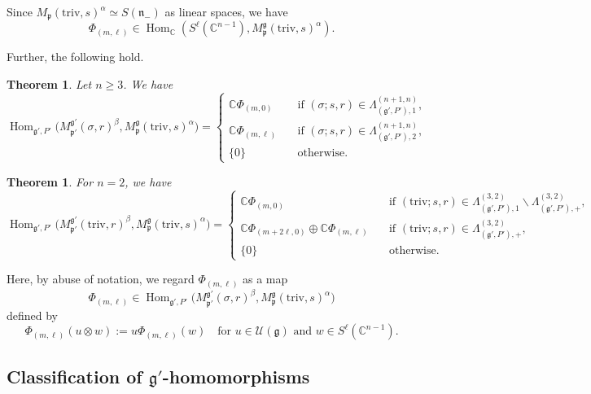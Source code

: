 \documentclass[reqno,11pt]{amsart}
\newtheorem{thm}[equation]{Theorem}
\theoremstyle{remark}
\theoremstyle{definition}
\numberwithin{equation}{section}
\newcommand{\gb}{\beta}
\newcommand{\ga}{\alpha}
\newcommand{\gL}{\Lambda}
\newcommand{\fg}{{\mathfrak g}}
\newcommand{\fn}{{\mathfrak n}}
\newcommand{\fp}{{\mathfrak p}}
\newcommand{\C}{\mathbb{C}}
\newcommand{\Cal}{\mathcal}
\newcommand{\Hom}{\operatorname{Hom}}
\newcommand{\triv}{\mathrm{triv}}
\newcommand{\Mp}{M^{\fg}_{\fp}}
\newcommand{\Mpp}{M^{\fg'}_{\fp'}}
\begin{document}
\noindent
Since $M_\fp(\triv, s)^\ga \simeq S(\fn_-)$ as linear spaces,
we have
\begin{equation*}
\Phi_{(m,\ell)} \in \Hom_{\C}(S^\ell(\C^{n-1}), \Mp(\triv, s)^\ga).
\end{equation*}

\noindent
Further, the following hold.

\begin{thm}\label{thm:Hom2a}
Let $n\geq 3$. We have
\begin{equation*}
\Hom_{\fg',P'}\big(\Mpp(\sigma,r)^\gb, \Mp(\triv, s)^\ga\big)
=
\begin{cases}
\C\Phi_{(m,0)} \quad &\text{if $(\sigma;s,r)\in \gL^{(n+1,n)}_{(\fg',P'),1}$},\\[3pt]
\C\Phi_{(m,\ell)} \quad &\text{if $(\sigma;s,r)\in \gL^{(n+1,n)}_{(\fg',P'),2}$},\\
\{0\} \quad &\text{otherwise}.
\end{cases}
\end{equation*}

\end{thm}

\begin{thm}\label{thm:Hom2b}
For $n = 2$, we have
\begin{equation*}
\Hom_{\fg',P'}\big(\Mpp(\triv,r)^\gb, \Mp(\triv, s)^\ga\big)
=
\begin{cases}
\C\Phi_{(m,0)} \quad 
&\text{if $(\triv;s,r)\in 
\gL^{(3,2)}_{(\fg',P'),1}\backslash  \gL^{(3,2)}_{(\fg',P'),+}$},\\[3pt]
\C\Phi_{(m+2\ell,0)}\oplus \C\Phi_{(m,\ell)} \quad 
&\text{if $(\triv;s,r)\in \gL^{(3,2)}_{(\fg',P'),+}$},\\
\{0\} \quad &\text{otherwise}.
\end{cases}
\end{equation*}
\end{thm}

Here, by abuse of notation, we regard 
$\Phi_{(m,\ell)}$ as a map
\begin{equation*}
\Phi_{(m,\ell)} \in 
\Hom_{\fg',P'}\big(\Mpp(\sigma,r)^\gb, \Mp(\triv, s)^\ga\big)
\end{equation*}
defined by
\begin{equation}\label{eqn:Phi-def}
\Phi_{(m,\ell)}(u\otimes w) := u\Phi_{(m,\ell)}(w)
\quad 
\text{for $u \in \Cal{U}(\fg)$ and $w \in S^\ell(\C^{n-1})$.}
\end{equation}


\subsection{Classification of $\fg'$-homomorphisms}
\label{subsec:g-hom}
\end{document}
